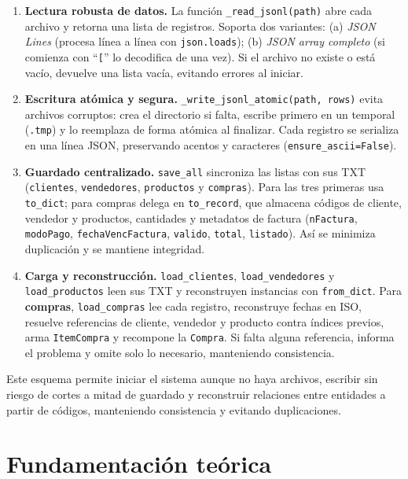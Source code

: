 \documentclass[11pt]{article}
\begin{document}
\begin{enumerate}
  \item \textbf{Lectura robusta de datos.} La función \texttt{\_read\_jsonl(path)} abre cada archivo y retorna una lista de registros. Soporta dos variantes: (a) \emph{JSON Lines} (procesa línea a línea con \texttt{json.loads}); (b) \emph{JSON array completo} (si comienza con ``\texttt{[}'' lo decodifica de una vez). Si el archivo no existe o está vacío, devuelve una lista vacía, evitando errores al iniciar.

  \item \textbf{Escritura atómica y segura.} \texttt{\_write\_jsonl\_atomic(path, rows)} evita archivos corruptos: crea el directorio si falta, escribe primero en un temporal (\texttt{.tmp}) y lo reemplaza de forma atómica al finalizar. Cada registro se serializa en una línea JSON, preservando acentos y caracteres (\texttt{ensure\_ascii=False}).

  \item \textbf{Guardado centralizado.} \texttt{save\_all} sincroniza las listas con sus TXT (\texttt{clientes}, \texttt{vendedores}, \texttt{productos} y \texttt{compras}). Para las tres primeras usa \texttt{to\_dict}; para compras delega en \texttt{to\_record}, que almacena códigos de cliente, vendedor y productos, cantidades y metadatos de factura (\texttt{nFactura}, \texttt{modoPago}, \texttt{fechaVencFactura}, \texttt{valido}, \texttt{total}, \texttt{listado}). Así se minimiza duplicación y se mantiene integridad.

  \item \textbf{Carga y reconstrucción.} \texttt{load\_clientes}, \texttt{load\_vendedores} y \texttt{load\_productos} leen sus TXT y reconstruyen instancias con \texttt{from\_dict}. Para \textbf{compras}, \texttt{load\_compras} lee cada registro, reconstruye fechas en ISO, resuelve referencias de cliente, vendedor y producto contra índices previos, arma \texttt{ItemCompra} y recompone la \texttt{Compra}. Si falta alguna referencia, informa el problema y omite solo lo necesario, manteniendo consistencia.
\end{enumerate}


Este esquema permite iniciar el sistema aunque no haya archivos, escribir sin riesgo de cortes a mitad de guardado y reconstruir relaciones entre entidades a partir de códigos, manteniendo consistencia y evitando duplicaciones.

\section{Fundamentación teórica} \label{sec:fundamentacion}
\end{document}
